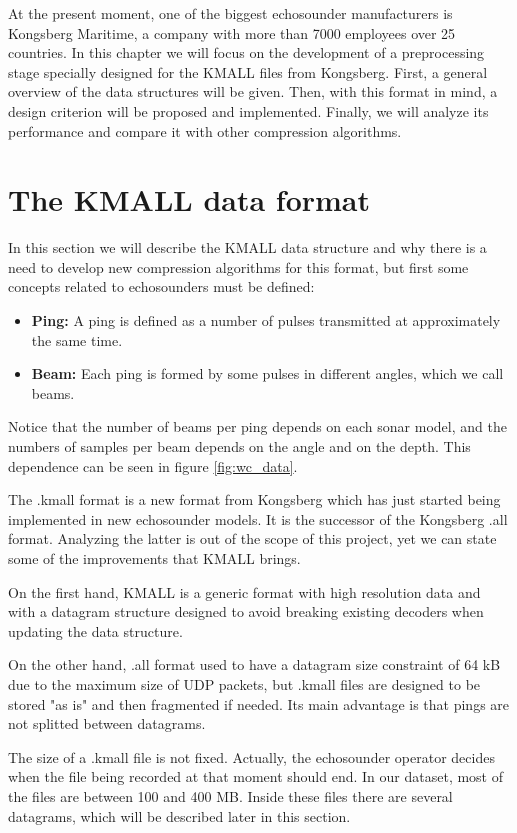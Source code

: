 At the present moment, one of the biggest echosounder manufacturers is Kongsberg Maritime, a company with more than 7000 employees over 25 countries. In this chapter we will focus on the development of a preprocessing stage specially designed for the KMALL files from Kongsberg. First, a general overview of the data structures will be given. Then, with this format in mind, a design criterion will be proposed and implemented. Finally, we will analyze its performance and compare it with other compression algorithms.

\section{The KMALL data format}
In this section we will describe the KMALL data structure and why there is a need to develop new compression algorithms for this format, but first some concepts related to echosounders must be defined:
\begin{itemize}
	\item \textbf{Ping:} A ping is defined as a number of pulses transmitted at approximately the same time.
	\item \textbf{Beam:} Each ping is formed by some pulses in different angles, which we call beams.
\end{itemize}

Notice that the number of beams per ping depends on each sonar model, and the numbers of samples per beam depends on the angle and on the depth. This dependence can be seen in figure \ref{fig:wc_data}.

The .kmall format is a new format from Kongsberg which has just started being implemented in new echosounder models. It is the successor of the Kongsberg .all format. Analyzing the latter is out of the scope of this project, yet we can state some of the improvements that KMALL brings.

On the first hand, KMALL is a generic format with high resolution data and with a datagram structure designed to avoid breaking existing decoders when updating the data structure.

On the other hand, .all format used to have a datagram size constraint of 64 kB due to the maximum size of UDP packets, but .kmall files are designed to be stored "as is" and then fragmented if needed. Its main advantage is that pings are not splitted between datagrams.

The size of a .kmall file is not fixed. Actually, the echosounder operator decides when the file being recorded at that moment should end. In our dataset, most of the files are between 100 and 400 MB. Inside these files there are several datagrams, which will be described later in this section.

